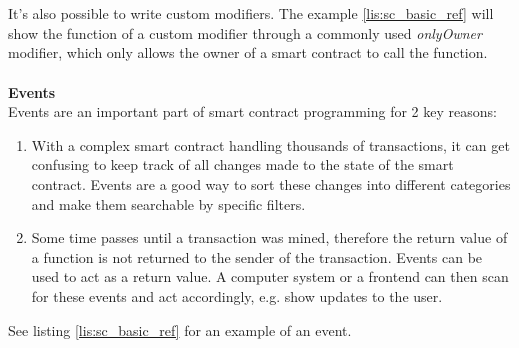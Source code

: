 \\\\
It's also possible to write custom modifiers. The example \ref{lis:sc_basic_ref} will show the function of a custom modifier through a commonly used \textit{onlyOwner} modifier, which only allows the owner of a smart contract to call the function.
\\\\
\textbf{Events}\\
Events are an important part of smart contract programming for 2 key reasons:
\begin{enumerate}
  \item With a complex smart contract handling thousands of transactions, it can get confusing to keep track of all changes made to the state of the smart contract. Events are a good way to sort these changes into different categories and make them searchable by specific filters.
  \item Some time passes until a transaction was mined, therefore the return value of a function is not returned to the sender of the transaction. Events can be used to act as a return value. A computer system or a frontend can then scan for these events and act accordingly, e.g. show updates to the user.
\end{enumerate}
See listing \ref{lis:sc_basic_ref} for an example of an event.
\\\\
